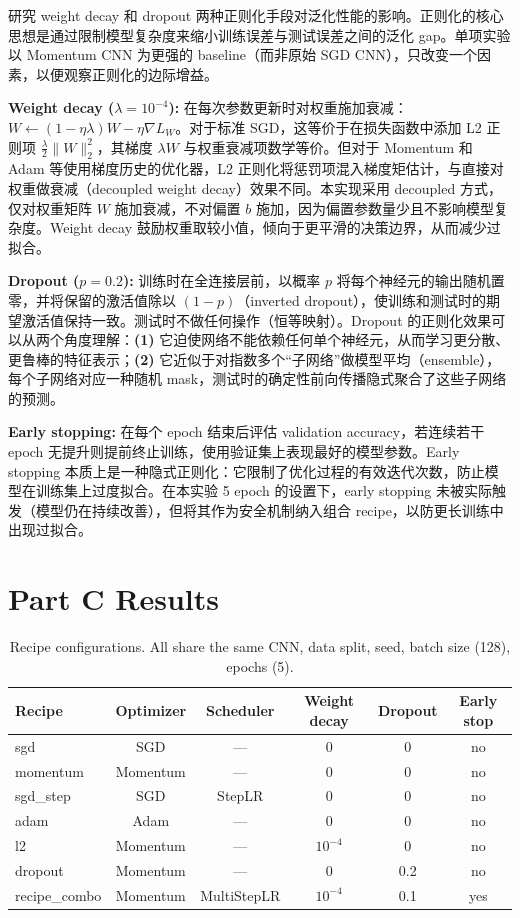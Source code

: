 \documentclass[11pt,fontset=fandol]{ctexart}
\begin{document}
研究 weight decay 和 dropout 两种正则化手段对泛化性能的影响。正则化的核心思想是通过限制模型复杂度来缩小训练误差与测试误差之间的泛化 gap。单项实验以 Momentum CNN 为更强的 baseline（而非原始 SGD CNN），只改变一个因素，以便观察正则化的边际增益。

\smallskip\noindent\textbf{Weight decay ($\lambda\!=\!10^{-4}$):}\;
在每次参数更新时对权重施加衰减：$W \leftarrow (1{-}\eta\lambda)W - \eta \nabla L_W$。对于标准 SGD，这等价于在损失函数中添加 L2 正则项 $\frac{\lambda}{2}\|W\|_2^2$，其梯度 $\lambda W$ 与权重衰减项数学等价。但对于 Momentum 和 Adam 等使用梯度历史的优化器，L2 正则化将惩罚项混入梯度矩估计，与直接对权重做衰减（decoupled weight decay）效果不同。本实现采用 decoupled 方式，仅对权重矩阵 $W$ 施加衰减，不对偏置 $b$ 施加，因为偏置参数量少且不影响模型复杂度。Weight decay 鼓励权重取较小值，倾向于更平滑的决策边界，从而减少过拟合。

\smallskip\noindent\textbf{Dropout ($p\!=\!0.2$):}\;
训练时在全连接层前，以概率 $p$ 将每个神经元的输出随机置零，并将保留的激活值除以 $(1{-}p)$（inverted dropout），使训练和测试时的期望激活值保持一致。测试时不做任何操作（恒等映射）。Dropout 的正则化效果可以从两个角度理解：\textbf{(1)} 它迫使网络不能依赖任何单个神经元，从而学习更分散、更鲁棒的特征表示；\textbf{(2)} 它近似于对指数多个``子网络''做模型平均（ensemble），每个子网络对应一种随机 mask，测试时的确定性前向传播隐式聚合了这些子网络的预测。

\smallskip\noindent\textbf{Early stopping:}\;
在每个 epoch 结束后评估 validation accuracy，若连续若干 epoch 无提升则提前终止训练，使用验证集上表现最好的模型参数。Early stopping 本质上是一种隐式正则化：它限制了优化过程的有效迭代次数，防止模型在训练集上过度拟合。在本实验 5 epoch 的设置下，early stopping 未被实际触发（模型仍在持续改善），但将其作为安全机制纳入组合 recipe，以防更长训练中出现过拟合。

\section{Part C Results}

\begin{table}[H]
\centering\small
\begin{tabular}{@{}lccccc@{}}
\toprule
Recipe & Optimizer & Scheduler & Weight decay & Dropout & Early stop \\
\midrule
sgd & SGD & --- & 0 & 0 & no \\
momentum & Momentum & --- & 0 & 0 & no \\
sgd\_step & SGD & StepLR & 0 & 0 & no \\
adam & Adam & --- & 0 & 0 & no \\
l2 & Momentum & --- & $10^{-4}$ & 0 & no \\
dropout & Momentum & --- & 0 & 0.2 & no \\
recipe\_combo & Momentum & MultiStepLR & $10^{-4}$ & 0.1 & yes \\
\bottomrule
\end{tabular}
\caption{Recipe configurations. All share the same CNN, data split, seed, batch size (128), epochs (5).}\label{tab:recipes}
\end{table}
\end{document}

